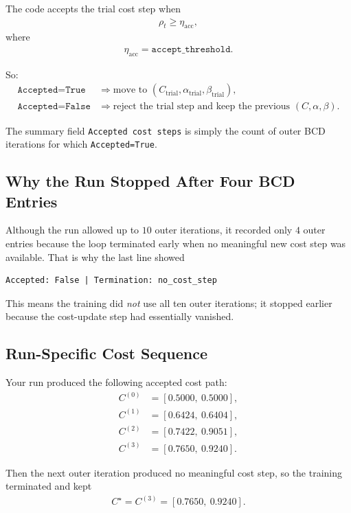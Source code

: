 \documentclass[11pt]{article}
\begin{document}
The code accepts the trial cost step when
\begin{align}
\rho_t \ge \eta_{\mathrm{acc}},
\end{align}
where
\begin{align}
\eta_{\mathrm{acc}} = \texttt{accept\_threshold}.
\end{align}

So:
\begin{align*}
\texttt{Accepted=True}
&\Longrightarrow
\text{move to } (C_{\mathrm{trial}}, \alpha_{\mathrm{trial}}, \beta_{\mathrm{trial}}), \\
\texttt{Accepted=False}
&\Longrightarrow
\text{reject the trial step and keep the previous } (C,\alpha,\beta).
\end{align*}

The summary field \texttt{Accepted cost steps} is simply the count of outer BCD
iterations for which \texttt{Accepted=True}.

\subsection{Why the Run Stopped After Four BCD Entries}
Although the run allowed up to $10$ outer iterations, it recorded only $4$
outer entries because the loop terminated early when no meaningful new cost step
was available. That is why the last line showed
\begin{verbatim}
Accepted: False | Termination: no_cost_step
\end{verbatim}
This means the training did \emph{not} use all ten outer iterations; it stopped
earlier because the cost-update step had essentially vanished.

\subsection{Run-Specific Cost Sequence}
Your run produced the following accepted cost path:
\begin{align}
C^{(0)} &= [0.5000,\ 0.5000], \\
C^{(1)} &= [0.6424,\ 0.6404], \\
C^{(2)} &= [0.7422,\ 0.9051], \\
C^{(3)} &= [0.7650,\ 0.9240].
\end{align}

Then the next outer iteration produced no meaningful cost step, so the training
terminated and kept
\begin{align}
C^\star = C^{(3)} = [0.7650,\ 0.9240].
\end{align}
\end{document}
